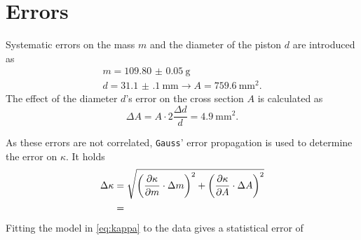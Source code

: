\section{Errors}
Systematic errors on the mass $m$ and the diameter of the piston $d$ are introduced as
\begin{gather*}
	m=\SI{109.80(5)}{\gram} \\
	d=\SI{31.1(1)}{\milli\meter}\rightarrow A=\SI{759.6}{\milli\meter\squared}.
\end{gather*}
The effect of the diameter $d$'s error on the cross section $A$ is calculated as
\begin{equation*}
	\Delta A=A\cdot2\frac{\Delta d}{d}=\SI{4.9}{\milli\meter\squared}.
\end{equation*}

As these errors are not correlated, \texttt{Gauss}' error propagation is used to determine the error on $\kappa$.
It holds
\begin{align}
	\Delta\kappa&=\sqrt{\left(\frac{\partial \kappa}{\partial m}\cdot\Delta m\right)^2+\left(\frac{\partial \kappa}{\partial A}\cdot\Delta A\right)^2} \\
	&=\num{}
\end{align}
Fitting the model in \autoref{eq:kappa} to the data gives a statistical error of
